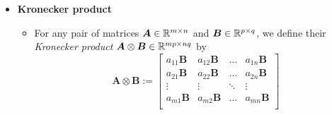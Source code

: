 \documentclass[12pt,a4paper]{article}
\begin{document}
\begin{itemize}

\item \textbf{Kronecker product}
  
  \begin{itemize}

  \item For any pair of matrices $\bm{A}\in \mathbb{R}^{m\times n}$ and $\bm{B}\in \mathbb{R}^{p\times q}$,
    we define their \emph{Kronecker product} $\bm{A}\otimes \bm{B} \in \mathbb{R}^{mp\times nq}$ by
    \begin{equation}\nonumber%
      \bm{A}\otimes \bm{B}
      :=
      \begin{bmatrix}
        a_{11}\bm{B} & a_{12}\bm{B} & \ldots & a_{1n}\bm{B} \\
        a_{21}\bm{B} & a_{22}\bm{B} & \ldots & a_{2n}\bm{B} \\
        \vdots & \vdots & \ddots & \vdots \\
        a_{m1}\bm{B} & a_{m2}\bm{B} & \ldots & a_{mn}\bm{B} \\
      \end{bmatrix}
    \end{equation}


\end{itemize}
\end{itemize}
\end{document}
